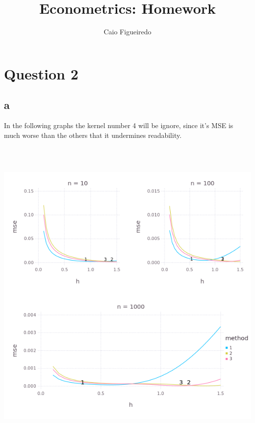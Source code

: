 \documentclass{article}
\title{Econometrics: Homework} %
\author{Caio Figueiredo} %
\begin{document}
\maketitle %


\section{Question 2}

\subsection{a}

In the following graphs the kernel number 4 will be ignore, since it's MSE 
is much worse than the others that it undermines readability.

\begin{center}
\includegraphics[width=16cm, height=16cm]{Q2-a.png}
\end{center}
\end{document}
